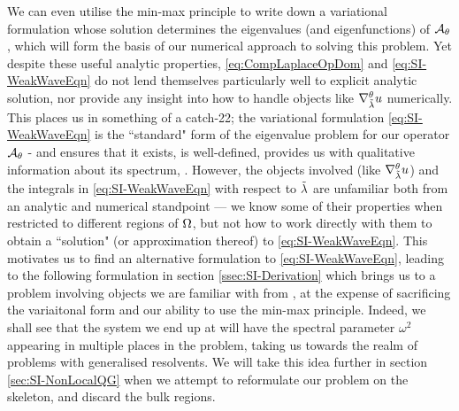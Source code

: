 We can even utilise the min-max principle to write down a variational formulation whose solution determines the eigenvalues (and eigenfunctions) of $\mathcal{A}_{\theta}$, which will form the basis of our numerical approach to solving this problem.
Yet despite these useful analytic properties, \eqref{eq:CompLaplaceOpDom} and \eqref{eq:SI-WeakWaveEqn} do not lend themselves particularly well to explicit analytic solution, nor provide any insight into how to handle objects like $\nabla^{\theta}_{\tilde{\lambda}}u$ numerically.
This places us in something of a catch-22; the variational formulation \eqref{eq:SI-WeakWaveEqn} is the ``standard" form of the eigenvalue problem for our operator $\mathcal{A}_{\theta}$ - and ensures that it exists, is well-defined, provides us with qualitative information about its spectrum, .
However, the objects involved (like $\nabla^{\theta}_{\tilde{\lambda}}u$) and the integrals in \eqref{eq:SI-WeakWaveEqn} with respect to $\tilde{\lambda}$ are unfamiliar both from an analytic and numerical standpoint --- we know some of their properties when restricted to different regions of $\Omega$, but not how to work directly with them to obtain a ``solution" (or approximation thereof) to \eqref{eq:SI-WeakWaveEqn}.
This motivates us to find an alternative formulation to \eqref{eq:SI-WeakWaveEqn}, leading to the following  formulation in section \ref{ssec:SI-Derivation} which brings us to a problem involving objects we are familiar with from , at the expense of sacrificing the variaitonal form and our ability to use the min-max principle.
Indeed, we shall see that the system we end up at will have the spectral parameter $\omega^2$ appearing in multiple places in the problem, taking us towards the realm of problems with generalised resolvents.
We will take this idea further in section \ref{sec:SI-NonLocalQG} when we attempt to reformulate our problem on the skeleton, and discard the bulk regions.

